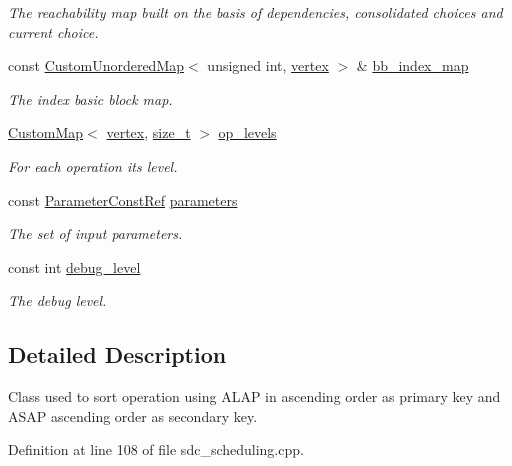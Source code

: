 \begin{DoxyCompactItemize}
\begin{DoxyCompactList}\small\item\em The reachability map built on the basis of dependencies, consolidated choices and current choice. \end{DoxyCompactList}\item 
const \hyperlink{custom__map_8hpp_ad1ed68f2ff093683ab1a33522b144adc}{Custom\+Unordered\+Map}$<$ unsigned int, \hyperlink{graph_8hpp_abefdcf0544e601805af44eca032cca14}{vertex} $>$ \& \hyperlink{classSDCSorter_a6599484ffd363c7ae18fa7bf1c515bc0}{bb\+\_\+index\+\_\+map}
\begin{DoxyCompactList}\small\item\em The index basic block map. \end{DoxyCompactList}\item 
\hyperlink{custom__map_8hpp_a18ca01763abbe3e5623223bfe5aaac6b}{Custom\+Map}$<$ \hyperlink{graph_8hpp_abefdcf0544e601805af44eca032cca14}{vertex}, \hyperlink{tutorial__fpt__2017_2intro_2sixth_2test_8c_a7c94ea6f8948649f8d181ae55911eeaf}{size\+\_\+t} $>$ \hyperlink{classSDCSorter_ab3fb25d7605e5f2cfc2f068659241aa6}{op\+\_\+levels}
\begin{DoxyCompactList}\small\item\em For each operation its level. \end{DoxyCompactList}\item 
const \hyperlink{Parameter_8hpp_a37841774a6fcb479b597fdf8955eb4ea}{Parameter\+Const\+Ref} \hyperlink{classSDCSorter_a988f0e368b0a6a2e4daec2e550977456}{parameters}
\begin{DoxyCompactList}\small\item\em The set of input parameters. \end{DoxyCompactList}\item 
const int \hyperlink{classSDCSorter_ab4626c8c8a617080cbf7173df53094c3}{debug\+\_\+level}
\begin{DoxyCompactList}\small\item\em The debug level. \end{DoxyCompactList}\end{DoxyCompactItemize}


\subsection{Detailed Description}
Class used to sort operation using A\+L\+AP in ascending order as primary key and A\+S\+AP ascending order as secondary key. 

Definition at line 108 of file sdc\+\_\+scheduling.\+cpp.



